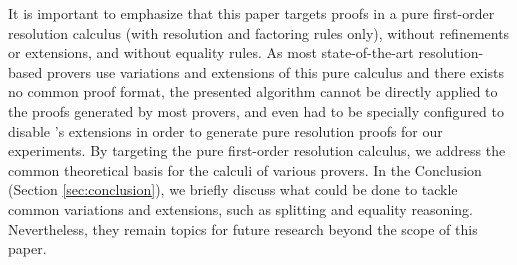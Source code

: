 It is important to emphasize that this paper targets proofs in a pure first-order resolution calculus (with resolution and factoring rules only), without refinements or extensions, and without equality rules. As most state-of-the-art resolution-based provers use variations and extensions of this pure calculus and there exists no common proof format, the presented algorithm cannot be directly applied to the proofs generated by most provers, and even {\SPASS} had to be specially configured to disable {\SPASS}'s extensions in order to generate pure resolution proofs for our experiments. By targeting the pure first-order resolution calculus, we address the common theoretical basis for the calculi of various provers. In the Conclusion (Section \ref{sec:conclusion}), we briefly discuss what could be done to tackle common variations and extensions, such as splitting and equality reasoning. Nevertheless, they remain topics for future research beyond the scope of this paper.
